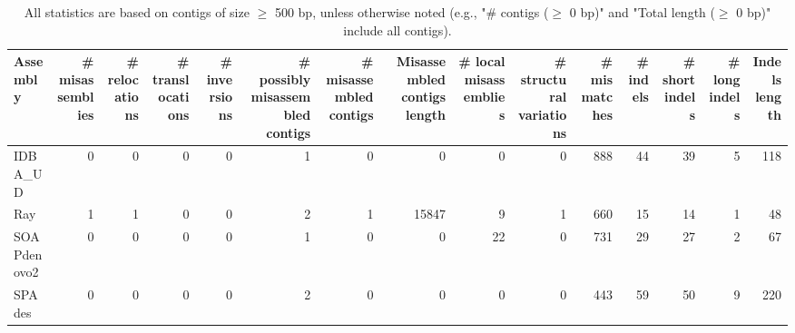 \documentclass[12pt,a4paper]{article}
\begin{document}
\begin{table}[ht]
\begin{center}
\caption{All statistics are based on contigs of size $\geq$ 500 bp, unless otherwise noted (e.g., "\# contigs ($\geq$ 0 bp)" and "Total length ($\geq$ 0 bp)" include all contigs).}
\begin{tabular}{|l*{14}{|r}|}
\hline
Assembly & \# misassemblies &     \# relocations &     \# translocations &     \# inversions & \# possibly misassembled contigs & \# misassembled contigs & Misassembled contigs length & \# local misassemblies & \# structural variations & \# mismatches & \# indels &     \# short indels &     \# long indels & Indels length \\ \hline
IDBA\_UD & 0 & 0 & 0 & 0 & 1 & 0 & 0 & 0 & 0 & 888 & 44 & 39 & 5 & 118 \\ \hline
Ray & 1 & 1 & 0 & 0 & 2 & 1 & 15847 & 9 & 1 & 660 & 15 & 14 & 1 & 48 \\ \hline
SOAPdenovo2 & 0 & 0 & 0 & 0 & 1 & 0 & 0 & 22 & 0 & 731 & 29 & 27 & 2 & 67 \\ \hline
SPAdes & 0 & 0 & 0 & 0 & 2 & 0 & 0 & 0 & 0 & 443 & 59 & 50 & 9 & 220 \\ \hline
\end{tabular}
\end{center}
\end{table}
\end{document}
